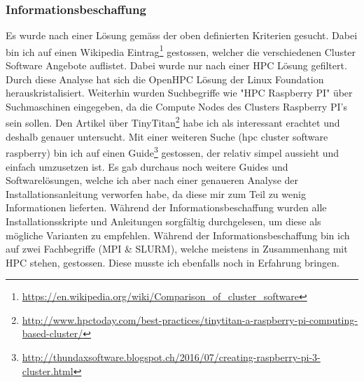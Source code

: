 \subsubsection{Informationsbeschaffung}
Es wurde nach einer Lösung gemäss der oben definierten Kriterien gesucht. Dabei bin ich auf einen Wikipedia Eintrag\footnote{\url{https://en.wikipedia.org/wiki/Comparison\_of\_cluster\_software}} gestossen, welcher die verschiedenen Cluster Software Angebote auflistet. Dabei wurde nur nach einer HPC Lösung gefiltert. Durch diese Analyse hat sich die OpenHPC Lösung der Linux Foundation herauskristalisiert. Weiterhin wurden Suchbegriffe wie "HPC Raspberry PI" über Suchmaschinen eingegeben, da die Compute Nodes des Clusters Raspberry PI's sein sollen. Den Artikel über TinyTitan\footnote{\url{http://www.hpctoday.com/best-practices/tinytitan-a-raspberry-pi-computing-based-cluster/}} habe ich als interessant erachtet und deshalb genauer untersucht.
Mit einer weiteren Suche (hpc cluster software raspberry) bin ich auf einen Guide\footnote{\url{http://thundaxsoftware.blogspot.ch/2016/07/creating-raspberry-pi-3-cluster.html}} gestossen, der relativ simpel aussieht und einfach umzusetzen ist. Es gab durchaus noch weitere Guides und Softwarelösungen, welche ich aber nach einer genaueren Analyse der Installationsanleitung verworfen habe, da diese mir zum Teil zu wenig Informationen lieferten. Während der Informationsbeschaffung wurden alle Installationsskripte und Anleitungen sorgfältig durchgelesen, um diese als mögliche Varianten zu empfehlen. Während der Informationsbeschaffung bin ich auf zwei Fachbegriffe (MPI \& SLURM), welche meistens in Zusammenhang mit HPC stehen, gestossen. Diese musste ich ebenfalls noch in Erfahrung bringen.






